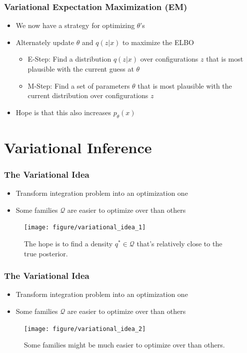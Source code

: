 \documentclass[10pt,mathserif]{beamer}
\begin{document}
\begin{frame}
  \frametitle{Variational Expectation Maximization (EM)}
  \begin{itemize}
  \item We now have a strategy for optimizing $\theta$'s
  \item Alternately update $\theta$ and $q\left(z \vert x\right)$ to maximize
    the ELBO
    \begin{itemize}
    \item E-Step: Find a distribution $q\left(z \vert x\right)$ over
      configurations $z$ that is most plausible with the current guess at
      $\theta$
    \item M-Step: Find a set of parameters $\theta$ that is most plausible with
      the current distribution over configurations $z$
    \end{itemize}
  \item Hope is that this also increases $p_{\theta}\left(x\right)$
  \end{itemize}
\end{frame}

\section{Variational Inference}
\label{sec:introduction}

\begin{frame}
  \frametitle{The Variational Idea}
  \begin{itemize}
  \item Transform integration problem into an optimization one
  \item Some families $\mathcal{Q}$ are easier to optimize over than others
  \end{itemize}
\begin{figure}[ht]
  \centering
  \texttt{[image: figure/variational\_idea\_1]}
  \caption{The hope is to find a density $q^{\ast} \in \mathcal{Q}$ that's
    relatively close to the true posterior. \label{fig:variational_idea_1} }
\end{figure}
\end{frame}

\begin{frame}
  \frametitle{The Variational Idea}
  \begin{itemize}
  \item Transform integration problem into an optimization one
  \item Some families $\mathcal{Q}$ are easier to optimize over than others
  \end{itemize}
\begin{figure}[ht]
  \centering
  \texttt{[image: figure/variational\_idea\_2]}
  \caption{Some families might be much easier to optimize over than others.
    \label{fig:variational_idea_1} }
\end{figure}
\end{frame}
\end{document}
